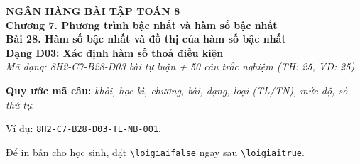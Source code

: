 \documentclass[12pt,a4paper]{article}
\newif\ifloigiai
\begin{document}
\begin{center}
{\Large\textbf{NGÂN HÀNG BÀI TẬP TOÁN 8}}\\[3pt]
\textbf{Chương 7. Phương trình bậc nhất và hàm số bậc nhất}\\[2pt]
\textbf{Bài 28. Hàm số bậc nhất và đồ thị của hàm số bậc nhất}\\[2pt]
\textbf{Dạng D03: Xác định hàm số thoả điều kiện}\\[2pt]
\textit{Mã dạng: 8H2-C7-B28-D03  bài tự luận + 50 câu trắc nghiệm \quad (TH: 25, VD: 25)}
\end{center}
\textbf{Quy ước mã câu:} \textit{khối, học kì, chương, bài, dạng, loại (TL/TN), mức độ, số thứ tự}.\par Ví dụ: \texttt{8H2-C7-B28-D03-TL-NB-001}.\par Để in bản cho học sinh, đặt \verb|\loigiaifalse| ngay sau \verb|\loigiaitrue|.
\end{document}
